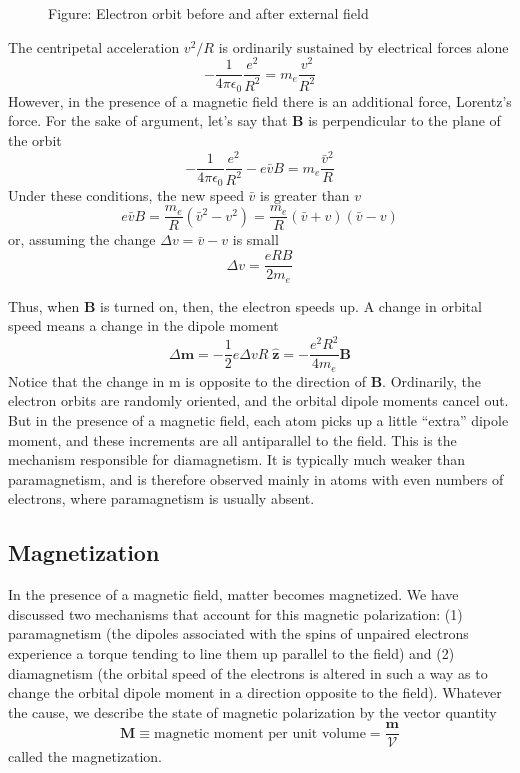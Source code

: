 \documentclass[../../../main.tex]{subfiles}
\begin{document}
\begin{figure*}[b]
    \centering
    \caption*{Figure: Electron orbit before and after external field}
\end{figure*}

The centripetal acceleration $v^2/R$ is ordinarily sustained by electrical forces alone
\begin{equation*}
    -\frac{1}{4\pi \epsilon_0}\frac{e^2}{R^2}=m_e\frac{v^2}{R^2}
\end{equation*}
However, in the presence of a magnetic ﬁeld there is an additional force, Lorentz's force. For the sake of argument, let's say that \textbf{B} is perpendicular to the plane of the orbit
\begin{equation*}
    -\frac{1}{4\pi \epsilon_0}\frac{e^2}{R^2}-e\bar{v}B=m_e\frac{\bar{v}^2}{R}
\end{equation*}
Under these conditions, the new speed $\bar{v}$ is greater than $v$
\begin{equation*}
    e\bar{v}B=\frac{m_e}{R}(\bar{v}^2-v^2)=\frac{m_e}{R}(\bar{v}+v)(\bar{v}-v)
\end{equation*}
or, assuming the change $\Delta v =\bar{v} - v$ is small
\begin{equation*}
    \Delta v =\frac{eRB}{2m_e}
\end{equation*}

Thus, when \textbf{B} is turned on, then, the electron speeds up. A change in orbital speed means a change in the dipole moment
\begin{equation*}
    \Delta\mathbf{m}=-\frac{1}{2}e\Delta v R \;\mathbf{\hat{z}}=-\frac{e^2R^2}{4m_e}\mathbf{B}
\end{equation*}
Notice that the change in m is opposite to the direction of \textbf{B}. Ordinarily, the electron orbits are randomly oriented, and the orbital dipole moments cancel out. But in the presence of a magnetic ﬁeld, each atom picks up a little “extra” dipole moment, and these increments are all antiparallel to the ﬁeld. This is the mechanism responsible for diamagnetism. It is typically much weaker than paramagnetism, and is therefore observed mainly in atoms with even numbers of electrons, where paramagnetism is usually absent.

\subsection{Magnetization}
In the presence of a magnetic ﬁeld, matter becomes magnetized. We have discussed two mechanisms that account for this magnetic polarization: (1) paramagnetism (the dipoles associated with the spins of unpaired electrons experience a torque tending to line them up parallel to the ﬁeld) and (2) diamagnetism (the orbital speed of the electrons is altered in such a way as to change the orbital dipole moment in a direction opposite to the ﬁeld). Whatever the cause, we describe the state of magnetic polarization by the vector quantity
\begin{equation*}
    \mathbf{M}\equiv\text{magnetic moment per unit volume}=\frac{\mathbf{m}}{\mathcal{V}}
\end{equation*}
called the magnetization. 
\end{document}
